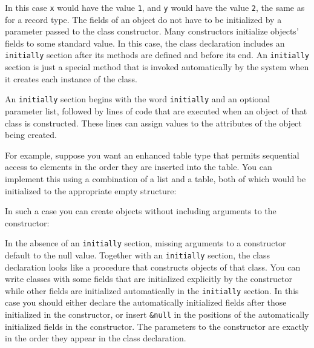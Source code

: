 In this case \texttt{x} would have the value \texttt{1}, and \texttt{y}
would have the value \texttt{2}, the same as for a record
type. The fields of an object do not have to be initialized by a
parameter passed to the class constructor. Many constructors initialize
objects' fields to some standard value. In this case,
the class declaration includes an \texttt{initially}
section after its methods are defined and before its end. An
\texttt{initially} section is just a special method that is invoked
automatically by the system when it creates each instance of the class.

An \texttt{initially} section begins with the word
\texttt{initially} and an optional parameter list, followed by lines of
code that are executed when an object of that class is constructed.
These lines can assign values to the attributes of the object
being created.

For example, suppose you want an enhanced table type that permits
sequential access to elements in the order they are inserted into the
table. You can implement this using a combination of a list and a
table, both of which would be initialized to the appropriate empty
structure: 


\noindent
In such a case you can create objects without including arguments to the
constructor: 


In the absence of an \texttt{initially} section, missing arguments to a
constructor default to the null value. Together with an
\texttt{initially} section, the class declaration looks like a
procedure that constructs objects of that class. You can
write classes with some fields that are initialized explicitly by the
constructor while other fields are initialized automatically in the
\texttt{initially} section. In this case you should either declare the
automatically initialized fields after those initialized in
the constructor, or insert \texttt{\&null} in the positions of the
automatically initialized fields in the constructor. The parameters to
the constructor are exactly in the order they appear in the class
declaration.

